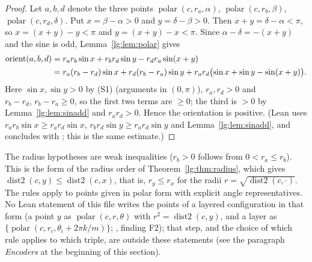 \begin{proof}
Let $a,b,d$ denote the three points $\operatorname{polar}(c,r_a,\alpha)$, $\operatorname{polar}(c,r_b,\beta)$,
$\operatorname{polar}(c,r_d,\delta)$. Put $x=\beta-\alpha>0$ and $y=\delta-\beta>0$. Then $x+y=\delta-\alpha<\pi$, so
$x=(x+y)-y<\pi$ and $y=(x+y)-x<\pi$. Since $\alpha-\delta=-(x+y)$ and the sine is odd, Lemma~\ref{lg:lem:polar} gives
\begin{align*}
  \operatorname{orient}(a,b,d)&=r_ar_b\sin x+r_br_d\sin y-r_dr_a\sin(x+y)\\
  &=r_a(r_b-r_d)\sin x+r_d(r_b-r_a)\sin y+r_ar_d\bigl(\sin x+\sin y-\sin(x+y)\bigr).
\end{align*}
Here $\sin x,\sin y>0$ by (S1) (arguments in $(0,\pi)$), $r_a,r_d>0$ and $r_b-r_d,\,r_b-r_a\ge0$, so the first two terms are
$\ge0$; the third is $>0$ by Lemma~\ref{lg:lem:sinadd} and $r_ar_d>0$. Hence the orientation is positive. (Lean uses
$r_ar_b\sin x\ge r_ar_d\sin x$, $r_br_d\sin y\ge r_ar_d\sin y$ and Lemma~\ref{lg:lem:sinadd}, and concludes with
; this is the same estimate.)
\end{proof}

\begin{remark}
The radius hypotheses are weak inequalities ($r_b>0$ follows from $0<r_a\le r_b$). This is the form of the radius
order of Theorem~\ref{lg:thm:radius}, which gives $\operatorname{dist2}(c,y)\le\operatorname{dist2}(c,x)$, that is,
$r_y\le r_x$ for the radii $r=\sqrt{\operatorname{dist2}(c,\cdot)}$. The rules apply to points given in polar form
with explicit angle representatives. No Lean statement of this file writes the points of a layered configuration in
that form (a point $y$ as $\operatorname{polar}(c,r,\theta)$ with $r^2=\operatorname{dist2}(c,y)$, and a layer as
$\{\operatorname{polar}(c,r_i,\theta_i+2\pi k/m)\}$; , finding F2); that step, and the
choice of which rule applies to which triple, are outside these statements (see the paragraph \emph{Encoders} at the
beginning of this section).
\end{remark}

